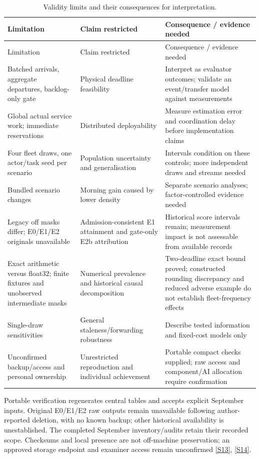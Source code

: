 \documentclass[11pt,a4paper]{article}
\begin{document}
\begingroup
\small
\begin{xltabular}{\textwidth}{@{}YYY@{}}
\caption{Validity limits and their consequences for interpretation.}\label{tab:12} \\
\toprule
Limitation & Claim restricted & Consequence / evidence needed \\
\midrule\endfirsthead
\toprule
Limitation & Claim restricted & Consequence / evidence needed \\
\midrule\endhead
\bottomrule\endfoot
Batched arrivals, aggregate departures, backlog-only gate & Physical deadline feasibility & Interpret as evaluator outcomes; validate an event/transfer model against measurements \\
Global actual service work; immediate reservations & Distributed deployability & Measure estimation error and coordination delay before implementation claims \\
Four fleet draws, one actor/task seed per scenario & Population uncertainty and generalisation & Intervals condition on these controls; more independent draws and streams needed \\
Bundled scenario changes & Morning gain caused by lower density & Separate scenario analyses; factor-controlled evidence needed \\
Legacy off masks differ; E0/E1/E2 originals unavailable & Admission-consistent E1 attainment and gate-only E2b attribution & Historical score intervals remain; measurement impact is not assessable from available records \\
Exact arithmetic versus float32; finite fixtures and unobserved intermediate masks & Numerical prevalence and historical causal decomposition & Two-deadline exact bound proved; constructed rounding discrepancy and reduced adverse example do not establish fleet-frequency effects \\
Single-draw sensitivities & General staleness/forwarding robustness & Describe tested information and fixed-cost models only \\
Unconfirmed backup/access and personal ownership & Unrestricted reproduction and individual achievement & Portable compact checks supplied; raw access and component/AI allocation require confirmation \\
\end{xltabular}
\endgroup

Portable verification regenerates central tables and accepts explicit September inputs. Original E0/E1/E2 raw outputs remain unavailable following author-reported deletion, with no known backup; other historical availability is unestablished. The completed September inventory/audits retain their recorded scope. Checksums and local presence are not off-machine preservation; an approved storage endpoint and examiner access remain unconfirmed \hyperref[source-s13]{[S13]}, \hyperref[source-s14]{[S14]}.
\end{document}
